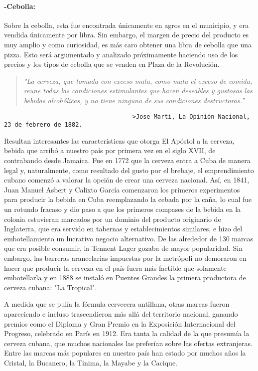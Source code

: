 \hypertarget{-cebolla}{%
\paragraph{-Cebolla:}\label{-cebolla}}

Sobre la cebolla, esta fue encontrada únicamente en agros en el
municipio, y era vendida únicamente por libra. Sin embargo, el margen de
precio del producto es muy amplio y como curiosidad, es más caro obtener
una libra de cebolla que una pizza. Esto será argumentado y analizado
próximamente haciendo uso de los precios y los tipos de cebolla que se
venden en Plaza de la Revolución.

\begin{quote}
\emph{"La cerveza, que tomada con exceso mata, como mata el exceso de
comida, reune todas las condiciones estimulantes que hacen deseables y
gustosas las bebidas alcohólicas, y no tiene ninguna de sus condiciones
destructoras.''}
\end{quote}

\begin{verbatim}
                                    >Jose Marti, La Opinión Nacional, 23 de febrero de 1882.
\end{verbatim}

Resultan interesantes las características que otorga El Apóstol a la
cerveza, bebida que arribó a nuestro país por primera vez en el siglo
XVII, de contrabando desde Jamaica. Fue en 1772 que la cerveza entra a
Cuba de manera legal y, naturalmente, como resultado del gusto por el
brebaje, el emprendimiento cubano comenzó a valorar la opción de crear
una cerveza nacional. Así, en 1841, Juan Manuel Asbert y Calixto García
comenzaron los primeros experimentos para producir la bebida en Cuba
reemplazando la cebada por la caña, lo cual fue un rotundo fracaso y dio
paso a que los primeros compases de la bebida en la colonia estuvieran
marcados por un dominio del producto originario de Inglaterra, que era
servido en tabernas y establecimientos similares, e hizo del
embotellamiento un lucrativo negocio alternativo. De las alrededor de
130 marcas que era posible consumir, la Tennent Lager gozaba de mayor
popularidad. Sin embargo, las barreras arancelarias impuestas por la
metrópoli no demoraron en hacer que producir la cerveza en el país fuera
más factible que solamente embotellarla y en 1888 se instaló en Puentes
Grandes la primera productora de cerveza cubana: "La Tropical".

A medida que se pulía la fórmula cervecera antillana, otras marcas
fueron apareciendo e incluso trascendieron más allá del territorio
nacional, ganando premios como el Diploma y Gran Premio en la Exposición
Internacional del Progreso, celebrado en París en 1912. Era tanta la
calidad de la que presumía la cerveza cubana, que muchos nacionales las
preferían sobre las ofertas extranjeras. Entre las marcas más populares
en nuestro país han estado por muchos años la Cristal, la Bucanero, la
Tinima, la Mayabe y la Cacique.

